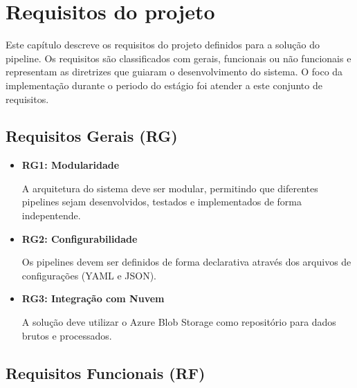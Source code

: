 \chapter{Requisitos do projeto}

Este capítulo descreve os requisitos do projeto definidos para a solução do pipeline. Os requisitos são classificados com gerais, funcionais ou não funcionais e representam as diretrizes que guiaram o desenvolvimento do sistema. O foco da implementação durante o periodo do estágio foi atender a este conjunto de requisitos.

\section{Requisitos Gerais (RG)}

\begin{itemize}
  \item \textbf{RG1: Modularidade}

  A arquitetura do sistema deve ser modular, permitindo que diferentes pipelines sejam desenvolvidos, testados e implementados de forma indepentende.

  \item \textbf{RG2: Configurabilidade}
  
  Os pipelines devem ser definidos de forma declarativa através dos arquivos de configurações (YAML e JSON).

  \item \textbf{RG3: Integração com Nuvem}
  
  A solução deve utilizar o Azure Blob Storage como repositório para dados brutos e processados.
\end{itemize}


\section{Requisitos Funcionais (RF)}

